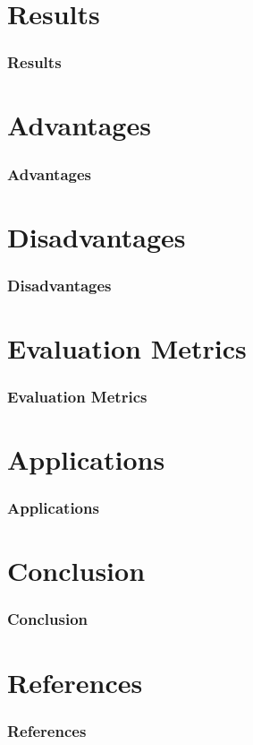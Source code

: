 \documentclass[aspectratio=169]{beamer}
\begin{document}
\section{Results}
\begin{frame}
	\centering
	\frametitle{Results}
	\begin{minipage}{0.95\textwidth}
	\end{minipage}
\end{frame}

\section{Advantages}
\begin{frame}
	\centering
	\frametitle{Advantages}
	\begin{minipage}{0.95\textwidth}
	\end{minipage}
\end{frame}

\section{Disadvantages}
\begin{frame}
	\centering
	\frametitle{Disadvantages}
	\begin{minipage}{0.95\textwidth}
	\end{minipage}
\end{frame}

\section{Evaluation Metrics}
\begin{frame}
	\centering
	\frametitle{Evaluation Metrics}
	\begin{minipage}{0.95\textwidth}
	\end{minipage}
\end{frame}

\section{Applications}
\begin{frame}
	\centering
	\frametitle{Applications}
	\begin{minipage}{0.95\textwidth}
	\end{minipage}
\end{frame}

\section{Conclusion}
\begin{frame}
	\centering
	\frametitle{Conclusion}
	\begin{minipage}{0.95\textwidth}
	\end{minipage}
\end{frame}

\section{References}
\begin{frame}
	\centering
	\frametitle{References}
	\begin{minipage}{0.95\textwidth}
	\end{minipage}
\end{frame}
\end{document}
